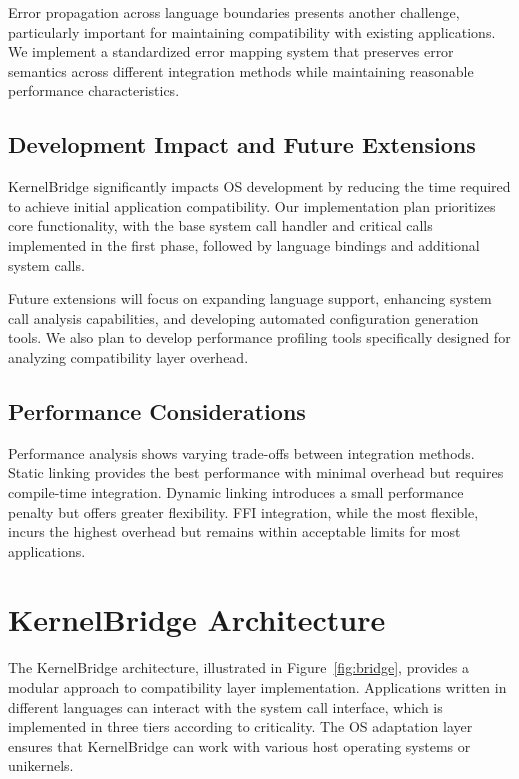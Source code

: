 \documentclass[conference]{IEEEtran}
\begin{document}
Error propagation across language boundaries presents another challenge, particularly important for maintaining compatibility with existing applications. We implement a standardized error mapping system that preserves error semantics across different integration methods while maintaining reasonable performance characteristics.

\subsection{Development Impact and Future Extensions}
KernelBridge significantly impacts OS development by reducing the time required to achieve initial application compatibility. Our implementation plan prioritizes core functionality, with the base system call handler and critical calls implemented in the first phase, followed by language bindings and additional system calls.

Future extensions will focus on expanding language support, enhancing system call analysis capabilities, and developing automated configuration generation tools. We also plan to develop performance profiling tools specifically designed for analyzing compatibility layer overhead.

\subsection{Performance Considerations}
Performance analysis shows varying trade-offs between integration methods. Static linking provides the best performance with minimal overhead but requires compile-time integration. Dynamic linking introduces a small performance penalty but offers greater flexibility. FFI integration, while the most flexible, incurs the highest overhead but remains within acceptable limits for most applications.

\section{KernelBridge Architecture}

The KernelBridge architecture, illustrated in Figure~\ref{fig:bridge}, provides a modular approach to compatibility layer implementation. Applications written in different languages can interact with the system call interface, which is implemented in three tiers according to criticality. The OS adaptation layer ensures that KernelBridge can work with various host operating systems or unikernels.
\end{document}

